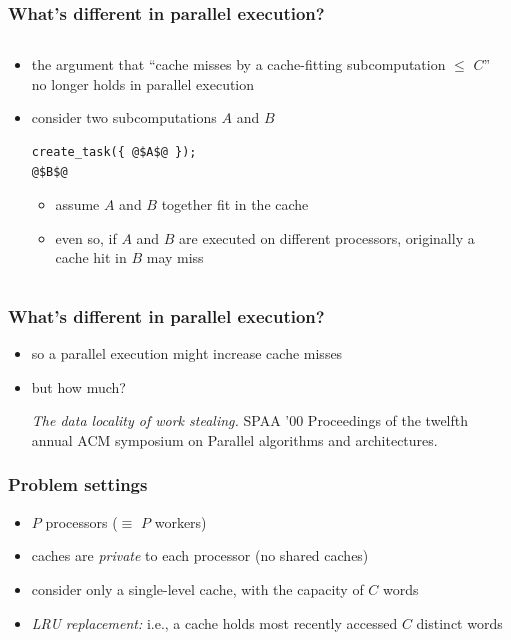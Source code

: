 \documentclass[12pt,dvipdfmx]{beamer}
\newcommand{\ao}[1]{{\color{blue}#1}}
\begin{document}
\begin{frame}[fragile]
\frametitle{What's different in parallel execution?}
\begin{columns}
\begin{column}{0.7\textwidth}
\begin{itemize}
\item<1-> the argument that ``cache misses by 
  a cache-fitting subcomputation $\leq$ $C$''
  no longer holds in parallel execution
\item<2-> consider two subcomputations $A$ and $B$
\begin{lstlisting}
create_task({ @$A$@ });
@$B$@
\end{lstlisting}
\begin{itemize}
\item assume $A$ and $B$ together fit in the cache
\item even so, if $A$ and $B$
  are executed on different processors, 
  originally a cache hit in $B$ may miss
\end{itemize}
\end{itemize}
\end{column}

\begin{column}{0.3\textwidth}
\def\svgwidth{\textwidth}
{\footnotesize }
\end{column}
\end{columns}
\end{frame}

\begin{frame}[fragile]
\frametitle{What's different in parallel execution?}

\begin{itemize}
\item so a parallel execution might increase cache
  misses
\item but how much? 

{\footnotesize {\it The data locality of work stealing.}  SPAA
'00 Proceedings of the twelfth annual ACM
symposium on Parallel algorithms and
architectures.}
\end{itemize}
\end{frame}

\begin{frame}[fragile]
\frametitle{Problem settings}
\begin{itemize}
\item $P$ processors ($\equiv$ $P$ workers)
\item caches are \ao{\em private} to each processor
  (no shared caches)
\item consider only a single-level cache, 
  with the capacity of $C$ words
\item \ao{\em LRU replacement:} i.e., a cache holds most
  recently accessed $C$ distinct words
\end{itemize}

\begin{center}
\def\svgwidth{0.7\textwidth}
{\scriptsize}
\end{center}
\end{frame}
\end{document}
